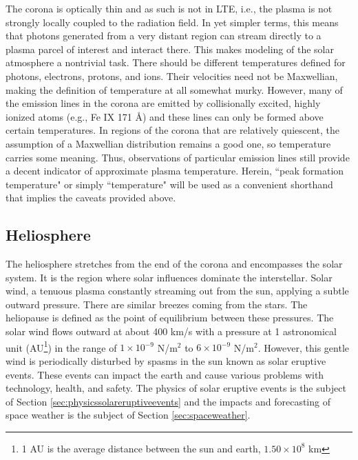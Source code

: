 The corona is optically thin and as such is not in LTE, i.e., the plasma is not strongly locally coupled to the radiation field. In yet simpler terms, this means that photons generated from a very distant region can stream directly to a plasma parcel of interest and interact there. This makes modeling of the solar atmosphere a nontrivial task. There should be different temperatures defined for photons, electrons, protons, and ions. Their velocities need not be Maxwellian, making the definition of temperature at all somewhat murky. However, many of the emission lines in the corona are emitted by collisionally excited, highly ionized atoms (e.g., Fe IX 171 \AA) and these lines can only be formed above certain temperatures. In regions of the corona that are relatively quiescent, the assumption of a Maxwellian distribution remains a good one, so temperature carries some meaning. Thus, observations of particular emission lines still provide a decent indicator of approximate plasma temperature. Herein, ``peak formation temperature" or simply ``temperature" will be used as a convenient shorthand that implies the caveats provided above. 

\subsection{Heliosphere}
The heliosphere stretches from the end of the corona and encompasses the solar system. It is the region where solar influences dominate the interstellar. Solar wind, a tenuous plasma constantly streaming out from the sun, applying a subtle outward pressure. There are similar breezes coming from the stars. The heliopause is defined as the point of equilibrium between these pressures. The solar wind flows outward at about 400 km/s with a pressure at 1 astronomical unit (AU\footnote{1 AU is the average distance between the sun and earth, $1.50 \times 10^8$ km}) in the range of $1 \times 10^{-9}$  N/m$^2$ to $6 \times 10^{-9}$ N/m$^2$. However, this gentle wind is periodically disturbed by spasms in the sun known as solar eruptive events. These events can impact the earth and cause various problems with technology, health, and safety. The physics of solar eruptive events is the subject of Section \ref{sec:physicssolareruptiveevents} and the impacts and forecasting of space weather is the subject of Section \ref{sec:spaceweather}. 

